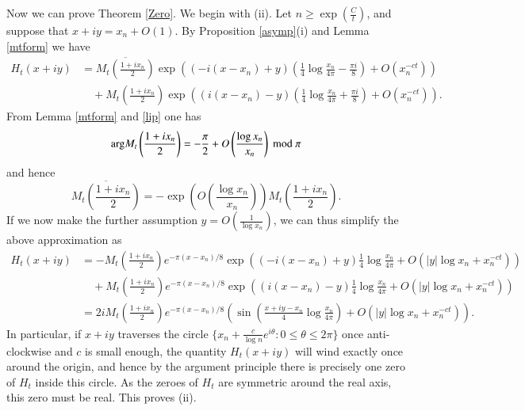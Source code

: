 \documentclass[a4paper,11pt,twoside]{amsart}
\begin{document}
Now we can prove Theorem \ref{Zero}.  We begin with (ii).  Let $n \geq \exp( \frac{C}{t})$, and suppose that $x+iy = x_n + O(1)$.  
By Proposition \ref{asymp}(i) and Lemma \ref{mtform} we have
\begin{equation}\label{htap}
\begin{split}
 H_t(x+iy) &= \overline{M_t\left(\frac{1+ix_n}{2}\right)} \exp\left( (-i(x-x_n)+y) \left(\frac{1}{4} \log \frac{x_n}{4\pi} - \frac{\pi i}{8}\right) + O( x_n^{-ct} )\right)\\
&\quad  + M_t\left(\frac{1+ix_n}{2}\right) \exp\left( (i(x-x_n)-y) \left(\frac{1}{4} \log \frac{x_n}{4\pi} + \frac{\pi i}{8}\right) + O( x_n^{-ct} )\right).
\end{split}
\end{equation}
From Lemma \ref{mtform} and \eqref{lip} one has
$$ \mathrm{arg} M_t\left(\frac{1+ix_n}{2}\right)  = -\frac{\pi}{2} + O\left( \frac{\log x_n}{x_n} \right)\hbox{ mod } \pi $$
and hence 
\begin{equation}\label{ma}
\overline{M_t\left(\frac{1+ix_n}{2}\right)} = - \exp\left( O( \frac{\log x_n}{x_n} ) \right) M_t\left(\frac{1+ix_n}{2}\right).
\end{equation}
If we now make the further assumption $y = O\left( \frac{1}{\log x_n}\right)$, we can thus simplify the above approximation as
\begin{equation}\label{ht-eff}
\begin{split}
 H_t(x+iy) &= - M_t\left(\frac{1+ix_n}{2}\right) e^{-\pi (x-x_n)/8} \exp\left( (-i(x-x_n)+y) \frac{1}{4} \log \frac{x_n}{4\pi} + O( |y| \log x_n + x_n^{-ct} ) \right)\\
&\quad + M_t\left(\frac{1+ix_n}{2}\right) e^{-\pi (x-x_n)/8} \exp\left( (i(x-x_n)-y) \frac{1}{4} \log \frac{x_n}{4\pi} + O( |y| \log x_n + x_n^{-ct} ) \right)\\
&= 2 i M_t\left(\frac{1+ix_n}{2}\right) e^{-\pi (x-x_n)/8} \left( \sin\left(\frac{x+iy-x_n}{4} \log \frac{x_n}{4\pi}\right) + O( |y| \log x_n + x_n^{-ct} )\right ).
\end{split}
\end{equation}
In particular, if $x+iy$ traverses the circle $\{ x_n + \frac{c}{\log n} e^{i\theta}: 0 \leq \theta \leq 2\pi\}$ once anti-clockwise and $c$ is small enough, the quantity $H_t(x+iy)$ will wind exactly once around the origin, and hence by the argument principle there is precisely one zero of $H_t$ inside this circle.  As the zeroes of $H_t$ are symmetric around the real axis, this zero must be real.  This proves (ii).
\end{document}
